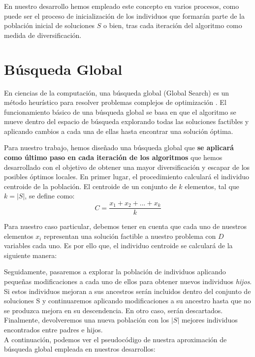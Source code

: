 En nuestro desarrollo hemos empleado este concepto en varios procesos, como puede ser el proceso de inicialización de los individuos que formarán parte de la población inicial de soluciones $S$ o bien, tras cada iteración del algoritmo como medida de diversificación. 

\section{Búsqueda Global}\label{sec:BG}

En ciencias de la computación, una búsqueda global (Global Search) es un método heurístico para resolver problemas complejos de optimización \cite{GlobalSearch, GlobalSearch2, GlobalSearch3}. %
%
El funcionamiento básico de una búsqueda global se basa en que el algoritmo se mueve dentro del espacio de búsqueda explorando todas las soluciones factibles y aplicando cambios a cada una de ellas hasta encontrar una solución óptima. 

Para nuestro trabajo, hemos diseñado una búsqueda global que \textbf{se aplicará como último paso en cada iteración de los algoritmos} que hemos desarrollado con el objetivo de obtener una mayor diversificación y escapar de los posibles óptimos locales. En primer lugar, el procedimiento calculará el individuo centroide de la población. El centroide de un conjunto de $k$ elementos, tal que $k = \left | S \right |$, se define como:
\begin{equation}\label{centroide}
    C = \frac{x_{1} + x_{2} + ... + x_{k}}{k}
\end{equation}

Para nuestro caso particular, debemos tener en cuenta que cada uno de nuestros elementos $x_{i}$ representan una solución factible a nuestro problema con $D$ variables cada uno. Es por ello que, el individuo centroide se calculará de la siguiente manera: 

Seguidamente, pasaremos a explorar la población de individuos aplicando pequeñas modificaciones a cada uno de ellos para obtener nuevos individuos \textit{hijos}. Si estos individuos mejoran a sus ancestros serán incluidos dentro del conjunto de soluciones S y continuaremos aplicando modificaciones a su ancestro hasta que no se produzca mejora en su descendencia. En otro caso, serán descartados.
Finalmente, devolveremos una nueva población con los $|S|$ mejores individuos encontrados entre padres e hijos. \\
A continuación, podemos ver el pseudocódigo de nuestra aproximación de búsqueda global empleada en nuestros desarrollos: 

